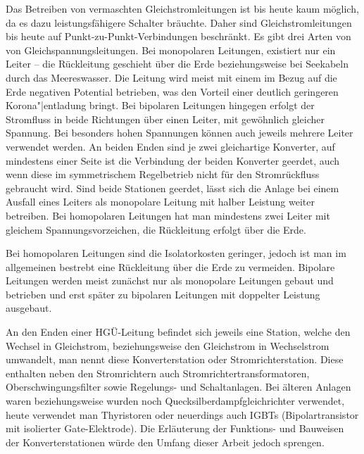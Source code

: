 Das Betreiben von vermaschten Gleichstromleitungen ist bis heute kaum möglich, da es dazu leistungsfähigere Schalter bräuchte.\cite{Schymroch}
Daher sind Gleichstromleitungen bis heute auf Punkt-zu-Punkt-Verbindungen beschränkt.
Es gibt drei Arten von von Gleichspannungsleitungen.
Bei monopolaren Leitungen, existiert nur ein Leiter – die Rückleitung geschieht über die Erde beziehungsweise bei Seekabeln durch das Meereswasser. Die Leitung wird meist mit einem im Bezug auf die Erde negativen Potential betrieben, was den Vorteil einer deutlich geringeren Korona"|entladung bringt.\cite{Padiyar}
Bei bipolaren Leitungen hingegen erfolgt der Stromfluss in beide Richtungen über einen Leiter, mit gewöhnlich gleicher Spannung. Bei besonders hohen Spannungen können auch jeweils mehrere Leiter verwendet werden. An beiden Enden sind je zwei gleichartige Konverter, auf mindestens einer Seite ist die Verbindung der beiden Konverter geerdet, auch wenn diese im symmetrischem Regelbetrieb nicht für den Stromrückfluss gebraucht wird. Sind beide Stationen geerdet, lässt sich die Anlage bei einem Ausfall eines Leiters als monopolare Leitung mit halber Leistung weiter betreiben.
Bei homopolaren Leitungen hat man mindestens zwei Leiter mit gleichem Spannungsvorzeichen, die Rückleitung erfolgt über die Erde.

Bei homopolaren Leitungen sind die Isolatorkosten geringer, jedoch ist man im allgemeinen bestrebt eine Rückleitung über die Erde zu vermeiden. Bipolare Leitungen werden meist zunächst nur als monopolare Leitungen gebaut und betrieben und erst später zu bipolaren Leitungen mit doppelter Leistung ausgebaut.\cite{Padiyar}

An den Enden einer HGÜ-Leitung befindet sich jeweils eine Station, welche den Wechsel in Gleichstrom, beziehungsweise den Gleichstrom in Wechselstrom umwandelt, man nennt diese Konverterstation oder Stromrichterstation. Diese enthalten neben den Stromrichtern auch Stromrichtertransformatoren, Oberschwingungsfilter sowie Regelungs- und Schaltanlagen. Bei älteren Anlagen waren beziehungsweise wurden noch Quecksilberdampfgleichrichter verwendet, heute verwendet man Thyristoren oder neuerdings auch IGBTs (Bipolartransistor mit isolierter Gate-Elektrode). Die Erläuterung der Funktions- und Bauweisen der Konverterstationen würde den Umfang dieser Arbeit jedoch sprengen.


